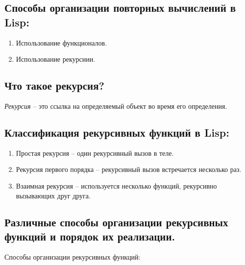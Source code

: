 \documentclass[a4paper,12pt]{article}
\begin{document}
 	\subsection*{Способы организации повторных вычислений в Lisp:}
 	
 	\begin{enumerate}
 		\item Использование функционалов.
 		\item Использование рекурсиии.
 	\end{enumerate}
 	
 	\subsection*{Что такое рекурсия?}
 	
 	\textit{Рекурсия} – это ссылка на определяемый объект во время его определения.
 	
 	\subsection*{Классификация рекурсивных функций в Lisp:}
 	
 	\begin{enumerate}
 		\item Простая рекурсия – один рекурсивный вызов в теле.
 		\item Рекурсия первого порядка – рекурсивный вызов встречается несколько раз.
 		\item Взаимная рекурсия – используется несколько функций, рекурсивно вызывающих друг друга.
 	\end{enumerate}
 	
 	\subsection*{Различные способы организации рекурсивных функций и порядок их реализации.}
 	
 	Способы организации рекурсивных функций:
 	
\end{document}
